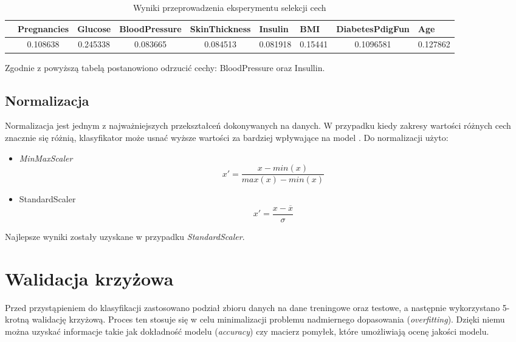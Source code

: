 \documentclass[12pt]{article}
\begin{document}
\begin{table}[H]
	\caption{Wyniki przeprowadzenia eksperymentu selekcji cech}
	\label{table:selekcja}
	\begin{adjustwidth}{-3cm}{}
		\begin{tabular}{@{}lllllllll@{}}
			\toprule
			  & Pregnancies                  & Glucose                      & BloodPressure                                        & SkinThickness                & Insulin                                              & BMI                         & DiabetesPdigFun               & Age                          \\ \midrule
			  & \multicolumn{1}{c}{0.108638} & \multicolumn{1}{c}{0.245338} & \multicolumn{1}{c}{\cellcolor[HTML]{FE0000}0.083665} & \multicolumn{1}{c}{0.084513} & \multicolumn{1}{c}{\cellcolor[HTML]{FE0000}0.081918} & \multicolumn{1}{c}{0.15441} & \multicolumn{1}{c}{0.1096581} & \multicolumn{1}{c}{0.127862} \\ \bottomrule
		\end{tabular}
	\end{adjustwidth}
\end{table}	
	
Zgodnie z powyższą tabelą postanowiono odrzucić cechy: BloodPressure oraz Insullin.
	
\subsection{Normalizacja}
Normalizacja jest jednym z najważniejszych przekształceń dokonywanych na danych. W przypadku kiedy zakresy wartości różnych cech znacznie się różnią, klasyfikator może usnać wyższe wartości za bardziej wpływające na model \cite{geron}.
Do normalizacji użyto:
\begin{itemize}
	\item \textit{MinMaxScaler}
	      \begin{equation}
	      	x' = \frac{x - min(x)}{max(x) - min(x)}
	      \end{equation}
	\item {StandardScaler}
	      \begin{equation}
	      	x' = \frac{x - \overline{x}}{\sigma}
	      \end{equation}
\end{itemize}
Najlepsze wyniki zostały uzyskane w przypadku \textit{StandardScaler}.

\section{Walidacja krzyżowa}
Przed przystąpieniem do klasyfikacji zastosowano podział zbioru danych na dane treningowe oraz testowe, a następnie wykorzystano 5-krotną walidację krzyżową. Proces ten stosuje się w celu minimalizacji problemu nadmiernego dopasowania (\textit{overfitting}). Dzięki niemu można uzyskać informacje takie jak dokładność modelu (\textit{accuracy}) czy macierz pomyłek, które umożliwiają ocenę jakości modelu.
	
\end{document}
